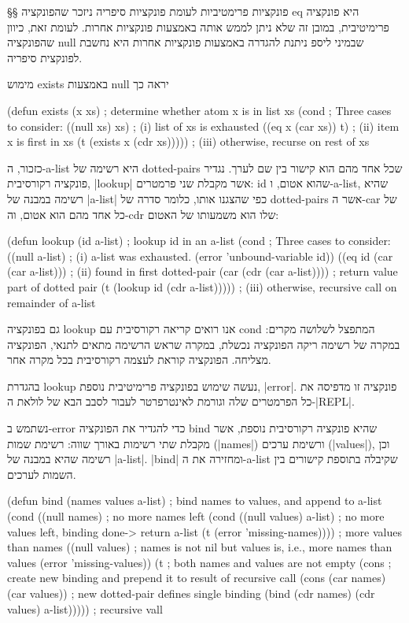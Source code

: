 §§ פונקציות פרימטיביות לעומת פונקציות סיפריה
ניזכר שהפונקציה eq היא פונקציה פרימיטיבית, במובן זה שלא ניתן לממש אותה באמצעות
פונקציות אחרות. לעומת זאת, כיוון שהפונקציה null שבמיני ליספ ניתנת להגדרה
באמצעות פונקציות אחרות היא נחשבת לפונקצית סיפריה.

מימוש exists באמצעות null יראה כך
\begin{KERNEL}
(defun exists (x xs) ; determine whether atom x is in list xs
  (cond ; Three cases to consider:
    ((null xs) xs) ; (i) list of xs is exhausted
    ((eq x (car xs)) t) ; (ii) item x is first in xs
    (t (exists x (cdr xs))))) ; (iii) otherwise, recurse on rest of xs
\end{KERNEL}

כזכור, ה-a-list היא רשימה של dotted-pairs שכל אחד מהם הוא קישור בין שם לערך.
נגדיר פונקציה רקורסיבית, \E|lookup| אשר מקבלת שני פרמטרים: id שהוא אטום,
ו-a-list, שהיא רשימה במבנה של \E|a-list| כפי שהצגנו אותו, כלומר סדרה של
dotted-pairs אשר ה-car של כל אחד מהם הוא אטום, וה-cdr שלו הוא משמעותו של האטום:
\begin{KERNEL}
(defun lookup (id a-list) ; lookup id in an a-list
  (cond ; Three cases to consider:
    ((null a-list) ; (i) a-list was exhausted.
      (error 'unbound-variable id))
    ((eq id (car (car a-list))) ; (ii) found in first dotted-pair
      (car (cdr (car a-list)))) ; return value part of dotted pair
    (t (lookup id (cdr a-list))))) ; (iii) otherwise, recursive call on remainder of a-list
\end{KERNEL}
גם בפונקציה lookup אנו רואים קריאה רקורסיבית עם cond המתפצל לשלושה מקרים: במקרה
של רשימה ריקה הפונקציה נכשלת, במקרה שראש הרשימה מתאים לתנאי, הפונקציה מצליחה.
הפונקציה קוראת לעצמה רקורסיבית בכל מקרה אחר.

בהגדרת lookup נעשה שימוש בפונקציה פרימיטיבית נוספת, \E|error|. פונקציה זו
מדפיסה את כל הפרמטרים שלה וגורמת לאינטרפרטר לעבור לסבב הבא של לולאת ה-\E|REPL|.

נשתמש ב-error כדי להגדיר את הפונקציה bind שהיא פונקציה רקורסיבית נוספת, אשר
מקבלת שתי רשימות באורך שווה: רשימת שמות (\E|names|) ורשימת ערכים (\E|values|),
וכן רשימה שהיא במבנה של \E|a-list|. \E|bind| ומחזירה את ה-a-list
שקיבלה בתוספת קישורים בין השמות לערכים.

\begin{KERNEL}
(defun bind (names values a-list) ; bind names to values, and append to a-list
  (cond ((null names) ; no more names left
        (cond ((null values) a-list) ; no more values left, binding done-> return a-list
              (t (error 'missing-names)))) ; more values than names
        ((null values) ; names is not nil but values is, i.e., more names than values
          (error 'missing-values))
        (t ; both names and values are not empty
          (cons ; create new binding and prepend it to result of recursive call
            (cons (car names) (car values)) ; new dotted-pair defines single binding
            (bind (cdr names) (cdr values) a-list))))) ; recursive vall
\end{KERNEL}


